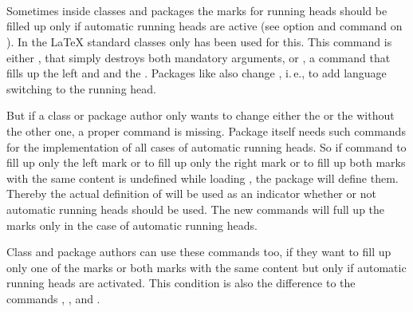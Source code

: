 \begin{Declaration}
  \\
  \\
  \\
\end{Declaration}
%
%
%
%
Sometimes inside classes and packages the marks for running heads should be
filled up only if automatic running heads are active (see option
 and command  on
). In the \LaTeX{} standard
classes only  has been used for this. This command is either
, that simply destroys both mandatory arguments, or
, a command that fills up the left and  and
the . Packages like  also change
\Macro{\@mkboth}, i.\,e., to add language switching to the running head.

But if a class or package author only wants to change either the  or the  without the other one, a proper command is
missing. Package  itself needs such commands for the
implementation of all cases of automatic running heads. So if command
 to fill up only the left mark or  to fill up
only the right mark or  to fill up both marks with the same
content is undefined while loading , the package will define
them. Thereby the actual definition of  will be used as an
indicator whether or not automatic running heads should be used. The new
commands will full up the marks only in the case of automatic running heads.

Class and package authors can use these commands too, if they want to fill up
only one of the marks or both marks with the same content but only if
automatic running heads are activated. This condition is also the difference
to the commands , , and .%
%
%
%
%

\fi %
\fi %

\ifshortversion%
%
\fi

